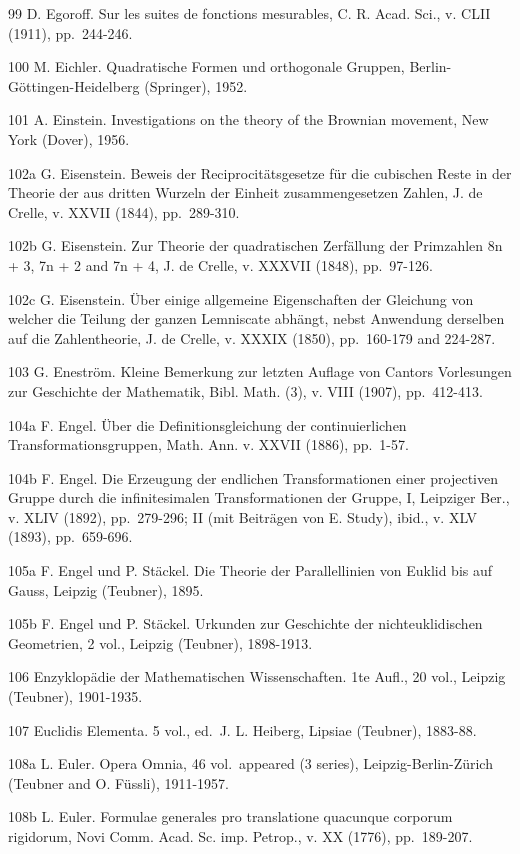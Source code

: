 99 D. Egoroff. Sur les suites de fonctions mesurables, C. R. Acad. Sci., v. CLII (1911), pp.~244-246.

100 M. Eichler. Quadratische Formen und orthogonale Gruppen, Berlin-Göttingen-Heidelberg (Springer), 1952.

101 A. Einstein. Investigations on the theory of the Brownian movement, New York (Dover), 1956.

102a G. Eisenstein. Beweis der Reciprocitätsgesetze für die cubischen Reste in der Theorie der aus dritten Wurzeln der Einheit zusammengesetzen Zahlen, J. de Crelle, v. XXVII (1844), pp.~289-310.

102b G. Eisenstein. Zur Theorie der quadratischen Zerfällung der Primzahlen 8n + 3, 7n + 2 and 7n + 4, J. de Crelle, v. XXXVII (1848), pp.~97-126.

102c G. Eisenstein. Über einige allgemeine Eigenschaften der Gleichung von welcher die Teilung der ganzen Lemniscate abhängt, nebst Anwendung derselben auf die Zahlentheorie, J. de Crelle, v. XXXIX (1850), pp.~160-179 and 224-287.

103 G. Eneström. Kleine Bemerkung zur letzten Auflage von Cantors Vorlesungen zur Geschichte der Mathematik, Bibl. Math. (3), v. VIII (1907), pp.~412-413.

104a F. Engel. Über die Definitionsgleichung der continuierlichen Transformationsgruppen, Math. Ann. v. XXVII (1886), pp.~1-57.

104b F. Engel. Die Erzeugung der endlichen Transformationen einer projectiven Gruppe durch die infinitesimalen Transformationen der Gruppe, I, Leipziger Ber., v. XLIV (1892), pp.~279-296; II (mit Beiträgen von E. Study), ibid., v. XLV (1893), pp.~659-696.

105a F. Engel und P. Stäckel. Die Theorie der Parallellinien von Euklid bis auf Gauss, Leipzig (Teubner), 1895.

105b F. Engel und P. Stäckel. Urkunden zur Geschichte der nichteuklidischen Geometrien, 2 vol., Leipzig (Teubner), 1898-1913.

106 Enzyklopädie der Mathematischen Wissenschaften. 1te Aufl., 20 vol., Leipzig (Teubner), 1901-1935.

107 Euclidis Elementa. 5 vol., ed.~J. L. Heiberg, Lipsiae (Teubner), 1883-88.

108a L. Euler. Opera Omnia, 46 vol.~appeared (3 series), Leipzig-Berlin-Zürich (Teubner and O. Füssli), 1911-1957.

108b L. Euler. Formulae generales pro translatione quacunque corporum rigidorum, Novi Comm. Acad. Sc. imp. Petrop., v. XX (1776), pp.~189-207.

